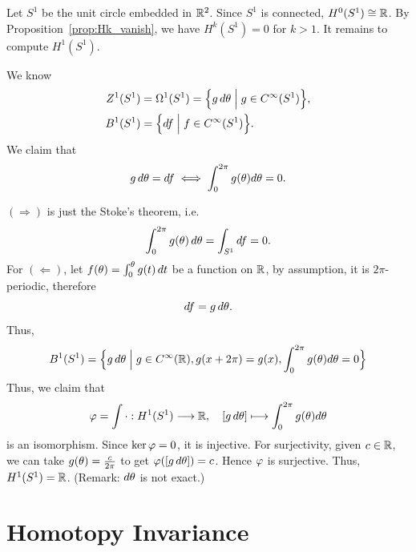 \begin{example}
    Let \(S^1\) be the unit circle embedded in \(\mathbb{R}^2\). Since \(S^1\) is connected, \(H^0(S^1)\cong \mathbb{R}\). By Proposition~\ref{prop:Hk_vanish}, we have \(H^k(S^1) = 0\) for \(k > 1\). It remains to compute \(H^1(S^1)\).
    \begin{roof}
        We know \begin{align*}
            Z^1(S^1) &= \Omega^1(S^1) = \Big\{g\,d\theta\Bigm| g\in C^\infty(S^1)\Big\}, \\
            B^1(S^1) &= \Big\{df\Bigm| f\in C^\infty(S^1)\Big\}.
        \end{align*}
        We claim that \[
            g\,d\theta = df \iff \int_0^{2\pi} g(\theta)d\theta = 0.
        \]
        \begin{roof}
            \((\Rightarrow)\) is just the Stoke's theorem, i.e. \[
                \int_0^{2\pi} g(\theta)\,d\theta = \int_{S^1} df = 0.
            \]
            For \((\Leftarrow)\), let \(f(\theta) = \int_0^\theta g(t)\,dt\) be a function on \(\mathbb{R}\), by assumption, it is \(2\pi\)-periodic, therefore \[
                df = g\,d\theta.
            \]
            Thus, \[
                B^1(S^1) = \Big\{
                    g\,d\theta \Bigm|
                    g\in C^\infty(\mathbb{R}), g(x+2\pi) = g(x), \int_0^{2\pi} g(\theta)d\theta = 0   
                \Big\}
            \]
            Thus, we claim that \[
                \varphi = \int\cdot : H^1(S^1) \longrightarrow \mathbb{R}, \quad [g\,d\theta] \longmapsto \int_0^{2\pi} g(\theta)d\theta
            \] is an isomorphism. Since \(\ker\varphi = 0\), it is injective. For surjectivity, given \(c\in\mathbb{R}\), we can take \(g(\theta) = \frac{c}{2\pi}\) to get \(\varphi([g\,d\theta]) = c\). Hence \(\varphi\) is surjective. Thus, \(H^1(S^1) = \mathbb{R}\). (Remark: \(d\theta\) is not exact.)
        \end{roof}
    \end{roof}
\end{example}




\section[Homotopy Invariance]{Homotopy Invariance}

